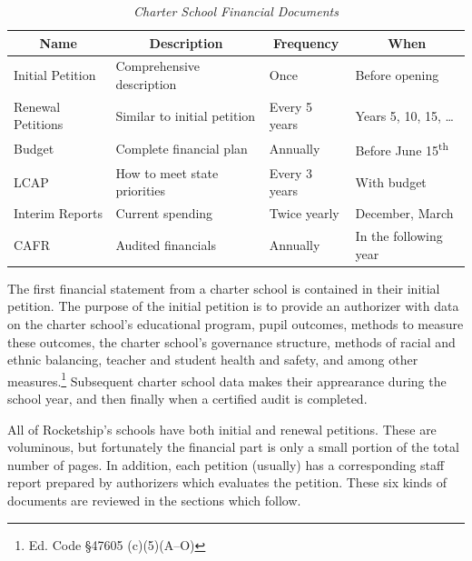 \begin{table}[ht]
  \centering\small%
  \caption[Charter School Financial Documents]{\textit{Charter School Financial Documents}}\label{tab:charter-fin-docs}%
  \begin{tabular}{llll}
    \toprule%
    \multicolumn{1}{c}{Name}  & \multicolumn{1}{c}{Description} & \multicolumn{1}{c}{Frequency} & \multicolumn{1}{c}{When} \\
    \midrule%
    Initial Petition  & Comprehensive description    & Once           & Before opening \\
    Renewal Petitions & Similar to initial petition  & Every 5 years  & Years 5, 10, 15, \ldots \\
    Budget            & Complete financial plan      & Annually       & Before June 15\textsuperscript{th} \\
    LCAP              & How to meet state priorities & Every 3 years  & With budget\\
    Interim Reports   & Current spending             & Twice yearly   & December, March \\
    CAFR              & Audited financials           & Annually       & In the following year \\
    \bottomrule%
  \end{tabular}
\end{table}%

The first financial statement from a charter school is contained in their initial petition. The purpose of the initial petition is to provide an authorizer with data on the charter school's educational program, pupil outcomes, methods to measure these outcomes, the charter school's governance structure, methods of racial and ethnic balancing, teacher and student health and safety, and among other measures.\footnote{Ed. Code §47605 (c)(5)(A–O)} Subsequent charter school data makes their apprearance during the school year, and then finally when a certified audit is completed.

All of Rocketship's schools have both initial and renewal petitions. These are voluminous, but fortunately the financial part is only a small portion of the total number of pages. In addition, each petition (usually) has a corresponding staff report prepared by authorizers which evaluates the petition. These six kinds of documents are reviewed in the sections which follow.

